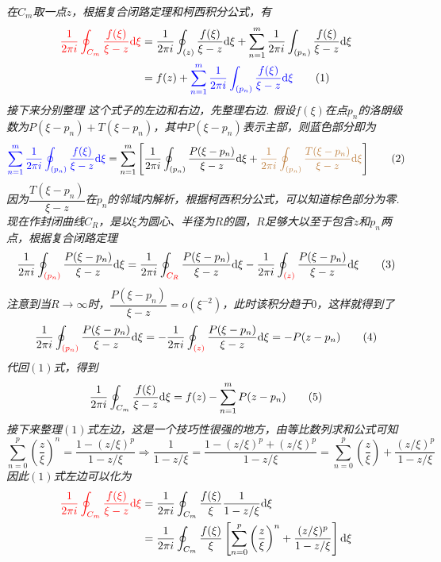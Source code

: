 \documentclass[UTF8]{ctexart}
\newcommand{\trm}[1]{{\rm #1}}
\begin{document}
\textit{
在\(C_m\)取一点\(z\)，根据复合闭路定理和柯西积分公式，有
\begin{align}
    {\color{red} \frac{1}{2\pi i}\oint_{C_m}\frac{f(\xi)}{\xi-z}\trm{d}\xi} &= 
    \frac{1}{2\pi i}\oint_{(z)}\frac{f(\xi)}{\xi-z}\trm{d}\xi
    +\sum_{n=1}^m\frac{1}{2\pi i}\int_{(p_n)}\frac{f(\xi)}{\xi-z}\trm{d}\xi \notag \\ 
    &= f(z) + {\color{blue}\sum_{n=1}^m\frac{1}{2\pi i}\int_{(p_n)}\frac{f(\xi)}{\xi-z}\trm{d}\xi} \tag{1}
\end{align} 
接下来分别整理 这个式子的左边和右边，先整理右边. 假设\(f(\xi)\)在点\(p_n\)的洛朗级数为\(P(\xi-p_n)+T(\xi-p_n)\)，其中\(P(\xi-p_n)\)表示主部，则蓝色部分即为
\[{\color{blue}\sum_{n=1}^m\frac{1}{2\pi i}\oint_{(p_n)}\frac{f(\xi)}{\xi-z}\trm{d}\xi} = 
\sum_{n=1}^m\left[\frac{1}{2\pi i}\oint_{(p_n)}\frac{P(\xi-p_n)}{\xi-z}\trm{d}\xi
+{\color{brown}\frac{1}{2\pi i}\oint_{(p_n)}\frac{T(\xi-p_n)}{\xi-z}\trm{d}\xi}\right] 
\tag{2}\]
因为\(\dfrac{T(\xi-p_n)}{\xi-z}\)在\(p_n\)的邻域内解析，根据柯西积分公式，可以知道棕色部分为零. 现在作封闭曲线\(C_R\)，是以\(\xi\)为圆心、半径为\(R\)的圆，\(R\)足够大以至于包含\(z\)和\(p_n\)两点，根据复合闭路定理
\[\frac{1}{2\pi i}\oint_{\color{red}(p_n)}\frac{P(\xi-p_n)}{\xi-z}\trm{d}\xi = 
\frac{1}{2\pi i}\oint_{\color{red}C_R}\frac{P(\xi-p_n)}{\xi-z}\trm{d}\xi 
- \frac{1}{2\pi i}\oint_{\color{red}(z)}\frac{P(\xi-p_n)}{\xi-z}\trm{d}\xi
\tag{3}\]
注意到当\(R\to\infty\)时，\(\dfrac{P(\xi-p_n)}{\xi-z}=o(\xi^{-2})\)，此时该积分趋于\(0\)，这样就得到了
\[\frac{1}{2\pi i}\oint_{\color{red}(p_n)}\frac{P(\xi-p_n)}{\xi-z}\trm{d}\xi = -\frac{1}{2\pi i}\oint_{\color{red}(z)}\frac{P(\xi-p_n)}{\xi-z}\trm{d}\xi = -P(z-p_n)\tag{4}\]
代回\((1)\)式，得到
\[\frac{1}{2\pi i}\oint_{C_m}\frac{f(\xi)}{\xi-z}\trm{d}\xi = f(z) - \sum_{n=1}^{m}P(z-p_n) \tag{5}\]
接下来整理\((1)\)式左边，这是一个技巧性很强的地方，由等比数列求和公式可知
\[\sum_{n=0}^{p}\left(\frac{z}{\xi}\right)^n = \frac{1-(z/\xi)^p}{1-z/\xi} \Longrightarrow \frac{1}{1-z/\xi} = \frac{1-(z/\xi)^p+(z/\xi)^p}{1-z/\xi} = \sum_{n=0}^{p}\left(\frac{z}{\xi}\right)+\frac{(z/\xi)^p}{1-z/\xi}\]
因此\((1)\)式左边可以化为
\begin{align}
    {\color{red} \frac{1}{2\pi i}\oint_{C_m}\frac{f(\xi)}{\xi-z}\trm{d}\xi} &= 
    \frac{1}{2\pi i}\oint_{C_m}\frac{f(\xi)}{\xi}\frac{1}{1-z/\xi}\trm{d}\xi \notag \\
    &= \frac{1}{2\pi i}\oint_{C_m}\frac{f(\xi)}{\xi}\left[\sum_{n=0}^{p}\left(\frac{z}{\xi}\right)^n+\frac{(z/\xi)^p}{1-z/\xi}\right]\trm{d}\xi \notag \\

\end{align}}
\end{document}
